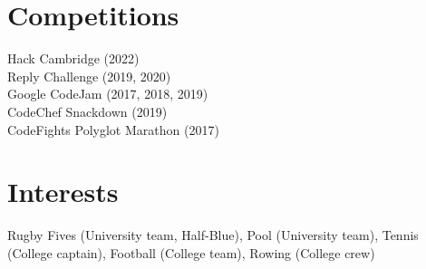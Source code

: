 \documentclass[a4paper,20pt]{article}
\begin{document}
\section{\textbf{Competitions}}
     Hack Cambridge (2022) \\
     Reply Challenge (2019, 2020) \\
     Google CodeJam (2017, 2018, 2019) \\
     CodeChef Snackdown (2019) \\
     CodeFights Polyglot Marathon (2017) \\
\section{\textbf{Interests}}
 Rugby Fives (University team, Half-Blue), Pool (University team), Tennis (College captain), Football (College team), Rowing (College crew)
\end{document}
